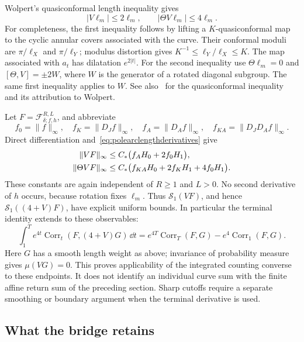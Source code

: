 Wolpert's quasiconformal length inequality gives
\begin{equation}
 |V\ell_m|\leq2\ell_m,
 \qquad |\Theta V\ell_m|\leq4\ell_m.
 \label{eq:polearclengthderivatives}
\end{equation}
For completeness, the first inequality follows by lifting a
$K$-quasiconformal map to the cyclic annular covers associated with the
curve. Their conformal moduli are $\pi/\ell_X$ and $\pi/\ell_Y$;
modulus distortion gives $K^{-1}\leq\ell_Y/\ell_X\leq K$.
The map associated with $a_t$ has dilatation $e^{2|t|}$.
For the second inequality use $\Theta\ell_m=0$ and
$[\Theta,V]=\pm2W$, where $W$ is the generator of a rotated diagonal
subgroup. The same first inequality applies to $W$.
See also~\cite[Equation~(1.1)]{ShigaHyperbolicQC} for the quasiconformal
inequality and its attribution to Wolpert.

Let $F=\mathcal F_{\delta;f,h}^{R,L}$, and abbreviate
\[
 f_0=\|f\|_\infty,\quad f_K=\|D_Jf\|_\infty,\quad
 f_A=\|D_Af\|_\infty,\quad f_{KA}=\|D_JD_Af\|_\infty.
\]
Direct differentiation and~\eqref{eq:polearclengthderivatives} give
\begin{align}
 \|VF\|_\infty
  &\leq C_*\bigl(f_AH_0+2f_0H_1\bigr),\notag\\
 \|\Theta VF\|_\infty
  &\leq C_*\bigl(f_{KA}H_0+2f_KH_1+4f_0H_1\bigr).
 \label{eq:polearcVnorms}
\end{align}
These constants are again independent of $R\geq1$ and $L>0$.
No second derivative of $h$ occurs, because rotation fixes $\ell_m$.
Thus $\mathcal S_1(VF)$, and hence $\mathcal S_1((4+V)F)$, have explicit
uniform bounds. In particular the terminal identity extends to these
observables:
\begin{equation}
 \int_1^T e^{4t}\operatorname{Corr}_t(F,(4+V)G)\,\dd t
 =e^{4T}\operatorname{Corr}_T(F,G)
   -e^4\operatorname{Corr}_1(F,G).
 \label{eq:polearcterminalidentity}
\end{equation}
Here $G$ has a smooth length weight as above; invariance of probability
measure gives $\mu(VG)=0$. This proves applicability of the integrated
counting converse to these endpoints. It does not identify an individual
curve sum with the finite affine return sum of the preceding section.
Sharp cutoffs require a separate smoothing or boundary argument when
the terminal derivative is used.

\subsection{What the bridge retains}
\label{subsec:polearcscope}

